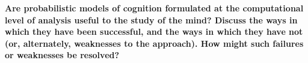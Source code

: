 \documentclass{article}
\begin{document}
\textbf{Are probabilistic models of cognition formulated at the computational level of analysis useful to the study of the mind? Discuss the ways in which they have been successful, and the ways in which they have not (or, alternately, weaknesses to the approach). How might such failures or weaknesses be resolved?}
\end{document}

